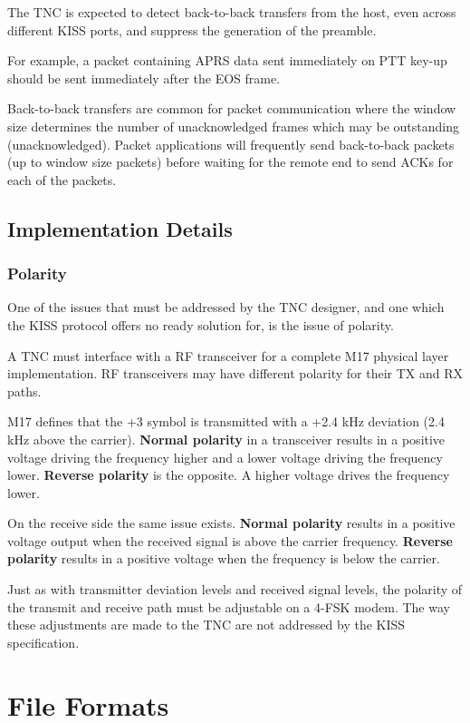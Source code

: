 \documentclass[a4paper,11pt,oneside]{book}
\begin{document}
The TNC is expected to detect back-to-back transfers from the host, even across different KISS ports, and suppress the generation of the preamble.

For example, a packet containing APRS data sent immediately on PTT key-up should be sent immediately after the EOS frame.

Back-to-back transfers are common for packet communication where the window size determines the number of unacknowledged frames which may be outstanding (unacknowledged). Packet applications will frequently send back-to-back packets (up to window size packets) before waiting for the remote end to send ACKs for each of the packets.

\section{Implementation Details}

\subsection{Polarity}

One of the issues that must be addressed by the TNC designer, and one which the KISS protocol offers no ready solution for, is the issue of polarity.

A TNC must interface with a RF transceiver for a complete M17 physical layer implementation. RF transceivers may have different polarity for their TX and RX paths.

M17 defines that the +3 symbol is transmitted with a +2.4 kHz deviation (2.4 kHz above the carrier). \textbf{Normal polarity} in a transceiver results in a positive voltage driving the frequency higher and a lower voltage driving the frequency lower. \textbf{Reverse polarity} is the opposite. A higher voltage drives the frequency lower.

On the receive side the same issue exists. \textbf{Normal polarity} results in a positive voltage output when the received signal is above the carrier frequency. \textbf{Reverse polarity} results in a positive voltage when the frequency is below the carrier.

Just as with transmitter deviation levels and received signal levels, the polarity of the transmit and receive path must be adjustable on a 4-FSK modem. The way these adjustments are made to the TNC are not addressed by the KISS specification.

\chapter{File Formats}
\end{document}
